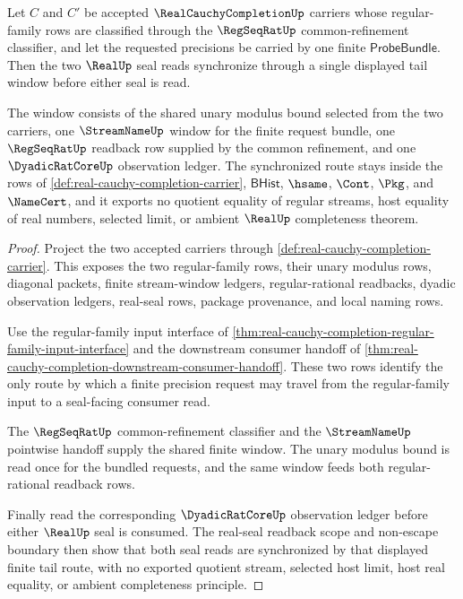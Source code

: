 \begin{theorem}
\label{thm:real-cauchy-completion-family-tail-synchronization}
Let $C$ and $C'$ be accepted $\RealCauchyCompletionUp$ carriers whose regular-family rows are classified through the $\RegSeqRatUp$ common-refinement classifier, and let the requested precisions be carried by one finite $\mathsf{ProbeBundle}$. Then the two $\RealUp$ seal reads synchronize through a single displayed tail window before either seal is read.

The window consists of the shared unary modulus bound selected from the two carriers, one $\StreamNameUp$ window for the finite request bundle, one $\RegSeqRatUp$ readback row supplied by the common refinement, and one $\DyadicRatCoreUp$ observation ledger. The synchronized route stays inside the rows of \autoref{def:real-cauchy-completion-carrier}, $\mathsf{BHist}$, $\hsame$, $\Cont$, $\Pkg$, and $\NameCert$, and it exports no quotient equality of regular streams, host equality of real numbers, selected limit, or ambient $\RealUp$ completeness theorem.
\end{theorem}
\begin{proof}
Project the two accepted carriers through \autoref{def:real-cauchy-completion-carrier}. This exposes the two regular-family rows, their unary modulus rows, diagonal packets, finite stream-window ledgers, regular-rational readbacks, dyadic observation ledgers, real-seal rows, package provenance, and local naming rows.

Use the regular-family input interface of \autoref{thm:real-cauchy-completion-regular-family-input-interface} and the downstream consumer handoff of \autoref{thm:real-cauchy-completion-downstream-consumer-handoff}. These two rows identify the only route by which a finite precision request may travel from the regular-family input to a seal-facing consumer read.

The $\RegSeqRatUp$ common-refinement classifier and the $\StreamNameUp$ pointwise handoff supply the shared finite window. The unary modulus bound is read once for the bundled requests, and the same window feeds both regular-rational readback rows.

Finally read the corresponding $\DyadicRatCoreUp$ observation ledger before either $\RealUp$ seal is consumed. The real-seal readback scope and non-escape boundary then show that both seal reads are synchronized by that displayed finite tail route, with no exported quotient stream, selected host limit, host real equality, or ambient completeness principle.
\end{proof}

